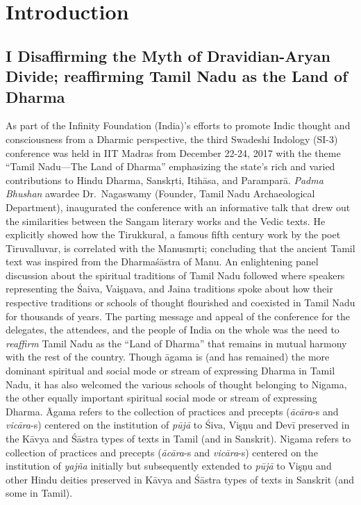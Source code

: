 
\chapter{Introduction}\label{intro}



\section*{I Disaffirming the Myth of Dravidian-Aryan Divide; reaffirming Tamil Nadu as the Land of Dharma}

\vskip 7pt

As part of the Infinity Foundation (India)’s efforts to promote Indic thought and consciousness from a Dharmic perspective, the third Swadeshi Indology (SI-3) conference was held in IIT Madras from December 22-24, 2017 with the theme “Tamil Nadu—The Land of Dharma” emphasizing the state’s rich and varied contributions to Hindu Dharma, Sanskŗti, Itihāsa, and Paramparā. \textit{Padma Bhushan} awardee Dr.\ Nagaswamy (Founder, Tamil Nadu Archaeological Department), inaugurated the conference with an informative talk that drew out the similarities between the Sangam literary works and the Vedic texts. He explicitly showed how the Tirukkural, a famous fifth century work by the poet Tiruvalluvar, is correlated with the Manusmŗti; concluding that the ancient Tamil text was inspired from the Dharmaśāstra of Manu. An enlightening panel discussion about the spiritual traditions of Tamil Nadu followed where speakers representing the Śaiva, Vaişņava, and Jaina traditions spoke about how their respective traditions or schools of thought flourished and coexisted in Tamil Nadu for thousands of years. The parting message and appeal of the conference for the delegates, the attendees, and the people of India on the whole was the need to \textit{reaffirm} Tamil Nadu as the “Land of Dharma” that remains in mutual harmony with the rest of the country. Though āgama is (and has remained) the more dominant spiritual and social mode or stream of expressing Dharma in Tamil Nadu, it has also welcomed the various schools of thought belonging to Nigama, the other equally important spiritual social mode or stream of expressing Dharma. Āgama refers to the collection of practices and precepts (\textit{ācāra}-s and \textit{vicāra}-s) centered on the institution of \textit{pūjā} to Śiva, Vişņu and Devī preserved in the Kāvya and Śāstra types of texts in Tamil (and in Sanskrit). Nigama refers to collection of practices and precepts (\textit{ācāra}-s and \textit{vicāra}-s) centered on the institution of \textit{yajña} initially but subsequently extended to \textit{pūjā} to Vişņu and other Hindu deities preserved in Kāvya and Śāstra types of texts in Sanskrit (and some in Tamil).

